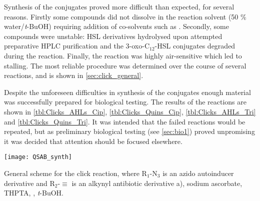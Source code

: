 Synthesis of the conjugates proved more difficult than expected, for several reasons. Firstly some compounds did not dissolve in the reaction solvent (50 \% water/\textit{t}-BuOH) requiring addition of co-solvents such as . Secondly, some compounds were unstable: HSL derivatives hydrolysed upon attempted preparative HPLC purification and the 3-oxo-C$_{12}$-HSL conjugates degraded during the reaction. Finally, the reaction was highly air-sensitive which led to stalling. 
The most reliable procedure was determined over the course of several reactions, and is shown in \ref{sec:click_general}. 

Despite the unforeseen difficulties in synthesis of the conjugates enough material was successfully prepared for biological testing. The results of the reactions are shown in \ref{tbl:Clicks_AHLs_Cip}, \ref{tbl:Clicks_Quins_Cip}, \ref{tbl:Clicks_AHLs_Tri} and \ref{tbl:Clicks_Quins_Tri}. It was intended that the failed reactions would be repeated, but as preliminary biological testing (see \ref{sec:bio1}) proved unpromising it was decided that attention should be focused elsewhere.


\begin{scheme}[H]
	\begin{center}
		\texttt{[image: QSAB\_synth]}
		\caption{General scheme for the click reaction, where R$_1$-N$_3$ is an azido autoinducer derivative and R$_2$-$\equiv$ is an alkynyl antibiotic derivative a), sodium ascorbate, THPTA, , \textit{t}-BuOH.\label{sch:QSAB_synth}} 
	\end{center}
\end{scheme}

